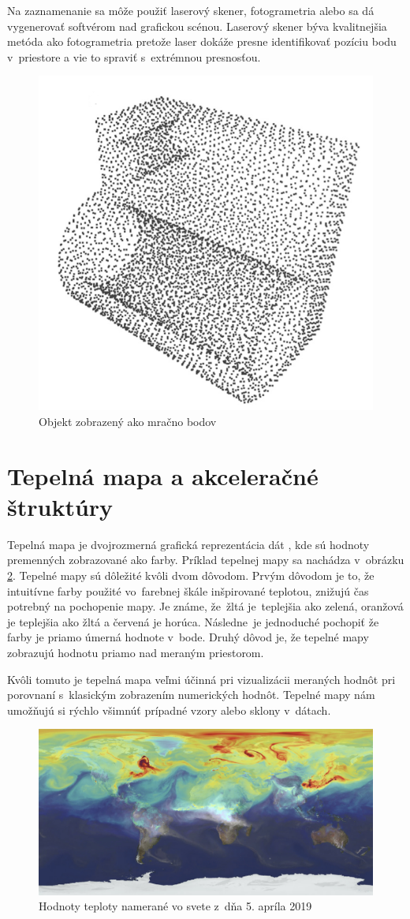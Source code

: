 Na zaznamenanie sa môže použiť laserový skener, fotogrametria alebo sa dá vygenerovať softvérom nad grafickou scénou. Laserový skener býva kvalitnejšia metóda ako fotogrametria pretože laser dokáže presne identifikovať pozíciu bodu v~priestore a vie to spraviť s~extrémnou presnosťou. 
\begin{figure}[b!]
    \centering
    \includegraphics[width=0.275\linewidth]{obrazky-figures/PC.png}
    \caption{Objekt zobrazený ako mračno bodov \cite{PCImg}}
    \label{PC}
\end{figure}

\section{Tepelná mapa a akceleračné štruktúry}
\label{HMlabel}
Tepelná mapa je dvojrozmerná grafická reprezentácia dát \cite{Heatmaps_intro}, kde sú hodnoty premenných zobrazované ako farby. Príklad tepelnej mapy sa nachádza v~obrázku \ref{HeatMap}. Tepelné mapy sú dôležité kvôli dvom dôvodom. Prvým dôvodom je to, že intuitívne farby použité vo~farebnej škále inšpirované teplotou, znižujú čas potrebný na pochopenie mapy. Je známe, že~žltá je~teplejšia ako zelená, oranžová je teplejšia ako žltá a červená je horúca. Následne~je jednoduché pochopiť že  farby je priamo úmerná hodnote v~bode. Druhý dôvod je, že tepelné mapy zobrazujú hodnotu priamo nad meraným priestorom. 

Kvôli tomuto je tepelná mapa veľmi účinná pri vizualizácii meraných hodnôt pri porovnaní s~klasickým zobrazením numerických hodnôt. Tepelné mapy nám umožňujú si rýchlo všimnúť prípadné vzory alebo sklony v~dátach.
\begin{figure}[t]
    \centering
    \includegraphics[width=0.75\linewidth]{obrazky-figures/World_heat_map.jpg}
    \caption{Hodnoty teploty namerané vo svete z~dňa 5. apríla 2019 \cite{heatmapwiki}}
    \label{HeatMap}
\end{figure}

